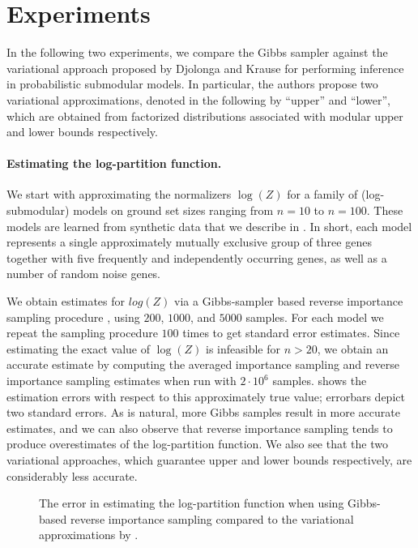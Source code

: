 \section{Experiments}
In the following two experiments, we compare the Gibbs sampler against the variational approach proposed by Djolonga and Krause \cite{djolonga14} for performing inference in probabilistic submodular models.
In particular, the authors propose two variational approximations, denoted in the following by ``upper'' and ``lower'', which are obtained from factorized distributions associated with modular upper and lower bounds respectively.

\paragraph{Estimating the log-partition function.}
We start with approximating the normalizers $\log(Z)$ for a family of (log-submodular) \flid{} models on ground set sizes ranging from $n = 10$ to $n = 100$.
These \flid{} models are learned from synthetic data that we describe in .
In short, each model represents a single approximately mutually exclusive group of three genes together with five frequently and independently occurring genes, as well as a number of random noise genes.

We obtain estimates for $log(Z)$ via a Gibbs-sampler based reverse importance sampling procedure , using $200$, $1000$, and $5000$ samples.
For each model we repeat the sampling procedure $100$ times to get standard error estimates.
Since estimating the exact value of $\log(Z)$ is infeasible for $n > 20$, we obtain an accurate estimate by computing the averaged importance sampling and reverse importance sampling estimates when run with $2\cdot 10^6$ samples.
 shows the estimation errors with respect to this approximately true value; errorbars depict two standard errors.
As is natural, more Gibbs samples result in more accurate estimates, and we can also observe that reverse importance sampling tends to produce overestimates of the log-partition function.
We also see that the two variational approaches, which guarantee upper and lower bounds respectively, are considerably less accurate.

\setlength{}
\setlength{}
\newcommand{\subflen}{\textwidth}
\begin{figure}[tb]
  \centering
  
  \caption{The error in estimating the log-partition function when using Gibbs-based reverse importance sampling compared to the variational approximations by \cite{djolonga14}.}
  \label{fig:gibbs_zest}
\end{figure}

